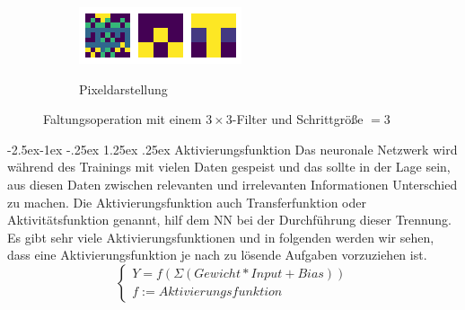 \documentclass[12pt,a4paper]{scrartcl}
\makeatletter
\numberwithin{equation}{section}
\renewcommand\paragraph{\@startsection{paragraph}{4}{\z@}%
	{-2.5ex\@plus -1ex \@minus -.25ex}%
	{1.25ex \@plus .25ex}%
	{\normalfont\normalsize\bfseries}}
\makeatother
\begin{document}
\begin{figure}[h!]
\begin{subfigure}{\textwidth}
		\label{fig:Faltungsoperation1}
	\end{subfigure}
	\begin{subfigure}{\textwidth}
		\centering
		\caption{ Pixeldarstellung }
		\includegraphics[width=\textwidth]{activation}
		\label{fig:Faltungsoperation2}
	\end{subfigure}
	
	\caption{Faltungsoperation mit einem $ 3\times 3$-Filter und Schrittgröße $ =3 $}
	\label{fig:Faltungsoperation}
\end{figure}

\paragraph{Aktivierungsfunktion}\label{Aktivierungsfunktion}
Das neuronale Netzwerk wird während des Trainings mit vielen Daten gespeist und das sollte in der Lage sein, aus diesen Daten zwischen relevanten und irrelevanten Informationen Unterschied zu machen.
Die Aktivierungsfunktion auch Transferfunktion oder Aktivitätsfunktion genannt, hilf dem \ac{NN} bei der Durchführung dieser Trennung. Es gibt sehr viele Aktivierungsfunktionen und in folgenden werden wir sehen, dass eine Aktivierungsfunktion je nach zu lösende Aufgaben  vorzuziehen ist.\[\begin{cases}
Y = f(\Sigma (Gewicht*Input + Bias))\\ f:= Aktivierungsfunktion
\end{cases} \]
\end{document}
